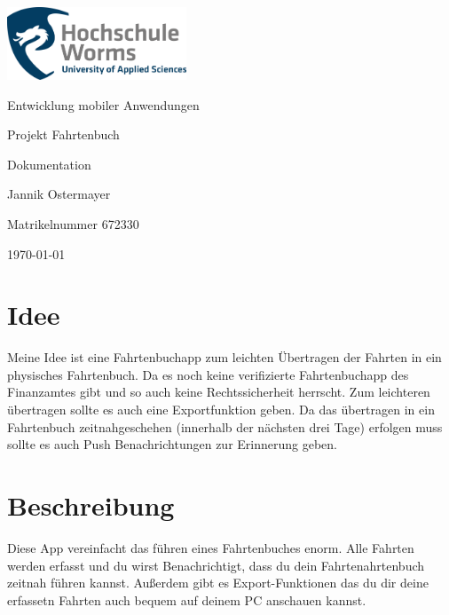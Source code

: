 \documentclass[a4paper]{article}
\author{Jannik Ostermayer}
\begin{document}
\pagestyle{scrheadings}         %
\clearpairofpagestyles          %
\ofoot{\pagemark}

\begin{titlepage}

	\centering
	\includegraphics[width=0.4\textwidth]{img/Logo_HS_Worms.png}\par\vspace{1cm}
	{\LARGE Entwicklung mobiler Anwendungen \par}
	\vspace{1.5cm}
	{\huge Projekt Fahrtenbuch\par}
	\vspace{0.3cm}
	{\huge Dokumentation\par}
	\vspace{2cm}
	{\Large Jannik Ostermayer\par}
	\vspace{1cm}
	{ Matrikelnummer 672330 \par}
	\vfill

	{\large \today\par}

\end{titlepage}

\tableofcontents    %
\pagebreak                              %

\section{Idee}
Meine Idee ist eine Fahrtenbuchapp zum leichten Übertragen 
der Fahrten in ein physisches Fahrtenbuch.
Da es noch keine verifizierte Fahrtenbuchapp 
des Finanzamtes gibt und so auch keine Rechtssicherheit herrscht.
Zum leichteren übertragen sollte es auch eine Exportfunktion geben.
Da das übertragen in ein Fahrtenbuch zeitnahgeschehen (innerhalb der 
nächsten drei Tage) erfolgen muss sollte es auch Push Benachrichtungen
zur Erinnerung geben. 

\section{Beschreibung}
Diese App vereinfacht das führen eines Fahrtenbuches enorm. 
Alle Fahrten werden erfasst und du wirst Benachrichtigt, dass du dein 
Fahrtenahrtenbuch zeitnah führen kannst. 
Außerdem gibt es Export-Funktionen das du dir deine erfassetn Fahrten 
auch bequem auf deinem PC anschauen kannst.
\end{document}
